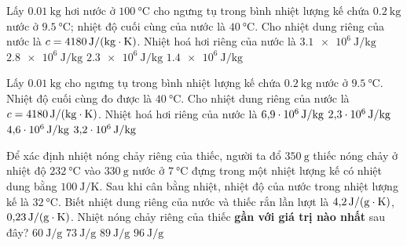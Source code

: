 \begin{ex}
	Lấy $\SI{0.01}{\kilogram}$ hơi nước ở $\SI{100}{\celsius}$ cho ngưng tụ trong bình nhiệt lượng kế chứa $\SI{0.2}{\kilogram}$ nước ở $\SI{9.5}{\celsius}$; nhiệt độ cuối cùng của nước là $\SI{40}{\celsius}$. Cho nhiệt dung riêng của nước là $c=\SI{4180}{\joule/\left(\kilogram\cdot\kelvin\right)}$. Nhiệt hoá hơi riêng của nước là
	\choice
	{$\SI{3.1e6}{\joule/\kilogram}$}
	{$\SI{2.8e6}{\joule/\kilogram}$}
	{\True $\SI{2.3e6}{\joule/\kilogram}$}
	{$\SI{1.4e6}{\joule/\kilogram}$}
\end{ex}

\begin{ex}
	Lấy $\SI{0.01}{\kilogram}$ cho ngưng tụ trong bình nhiệt lượng kế chứa $\SI{0.2}{\kilogram}$ nước ở $\SI{9.5}{\celsius}$. Nhiệt độ cuối cùng đo được là $\SI{40}{\celsius}$. Cho nhiệt dung riêng của nước là $c=\SI{4180}{\joule/\left(\kilogram\cdot\kelvin\right)}$. Nhiệt hoá hơi riêng của nước là
	\choice
	{$\SI{6.9E6}{\joule/\kilogram}$}
	{\True $\SI{2.3E6}{\joule/\kilogram}$}
	{$\SI{4.6E6}{\joule/\kilogram}$}
	{$\SI{3.2E6}{\joule/\kilogram}$}
\end{ex}
\begin{ex}
	Để xác định nhiệt nóng chảy riêng của thiếc, người ta đổ $\SI{350}{\gram}$ thiếc nóng chảy ở nhiệt độ $\SI{232}{\celsius}$ vào $\SI{330}{\gram}$ nước ở $\SI{7}{\celsius}$ đựng trong một nhiệt lượng kế có nhiệt dung bằng $\SI{100}{\joule/\kelvin}$. Sau khi cân bằng nhiệt, nhiệt độ của nước trong nhiệt lượng kế là $\SI{32}{\celsius}$. Biết nhiệt dung riêng của nước và thiếc rắn lần lượt là $\SI{4.2}{\joule/\left(\gram\cdot\kelvin\right)}$, $\SI{0.23}{\joule/\left(\gram\cdot\kelvin\right)}$. Nhiệt nóng chảy riêng của thiếc \textbf{gần với giá trị nào nhất} sau đây?
	\choice
	{\True $\SI{60}{\joule/\gram}$}
	{$\SI{73}{\joule/\gram}$}
	{$\SI{89}{\joule/\gram}$}
	{$\SI{96}{\joule/\gram}$}
\end{ex}

